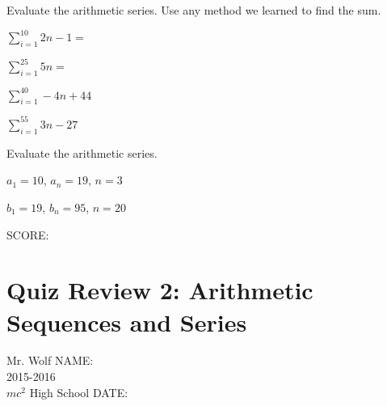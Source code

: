 \documentclass[12pt]{article}
\begin{document}
Evaluate the arithmetic series. Use any method we learned to find the sum.\\

\begin{enumerate}[resume]
\begin{multicols}{2}
\setlength\itemsep{1.5cm}

	\item $\sum\limits_{i=1}^{10} 2n-1=$\\
	
	\item $\sum\limits_{i=1}^{25} 5n =$\\
	
	\item $\sum\limits_{i=1}^{40} -4n+44$\\
	
	\item $\sum\limits_{i=1}^{55} 3n-27$\\

\end{multicols}
\end{enumerate}

Evaluate the arithmetic series.\\

\begin{enumerate}[resume]
\begin{multicols}{2}

	\item $a_1=10$, $a_n=19$, $n=3$\\
	
	\item $b_1=19$, $b_n=95$, $n=20$\\

\end{multicols}
\end{enumerate}

\vfill SCORE:\underline{\hspace{1in}}

\section*{Quiz Review 2: Arithmetic Sequences and Series}

Mr. Wolf \hfill NAME:\underline{\hspace{3in}}\\
2015-2016\\
$mc^2$ High School \hfill DATE:\underline{\hspace{2in}}\\
\end{document}
